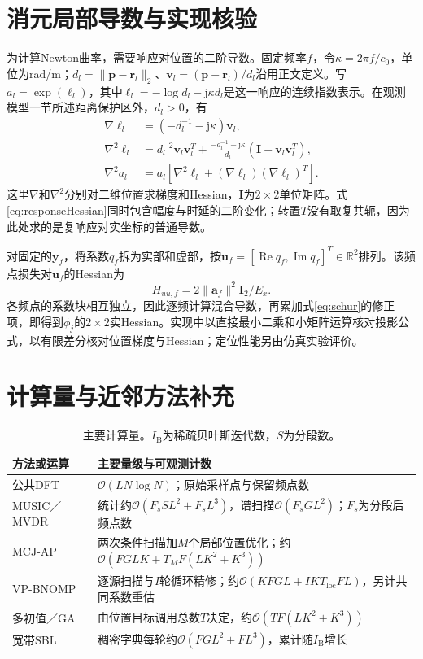 \documentclass[a4paper]{cas-sc}
\numberwithin{equation}{section}
\numberwithin{figure}{section}
\numberwithin{table}{section}
\newcommand{\R}{\mathbb R}
\newcommand{\Rea}{\operatorname{Re}}
\begin{document}
\section{消元局部导数与实现核验}\label{app:derivatives}
为计算Newton曲率，需要响应对位置的二阶导数。固定频率$f$，令$\kappa=2\pi f/c_0$，单位为rad/m；$d_l=\|\bm p-\bm r_l\|_2$、$\bm v_l=(\bm p-\bm r_l)/d_l$沿用正文定义。写$a_l=\exp(\ell_l)$，其中$\ell_l=-\log d_l-\mathrm j\kappa d_l$是这一响应的连续指数表示。在观测模型一节所述距离保护区外，$d_l>0$，有
\begin{align}
 \nabla\ell_l&=(-d_l^{-1}-\mathrm j\kappa)\bm v_l,\\
 \nabla^2\ell_l&=d_l^{-2}\bm v_l\bm v_l^T
 +\frac{-d_l^{-1}-\mathrm j\kappa}{d_l}
 (\bm I-\bm v_l\bm v_l^T),\\
 \nabla^2 a_l&=a_l[\nabla^2\ell_l+(\nabla\ell_l)(\nabla\ell_l)^T].\label{eq:responseHessian}
\end{align}
这里$\nabla$和$\nabla^2$分别对二维位置求梯度和Hessian，$\bm I$为$2\times2$单位矩阵。式\eqref{eq:responseHessian}同时包含幅度与时延的二阶变化；转置$T$没有取复共轭，因为此处求的是复响应对实坐标的普通导数。

对固定的$\bm y_f$，将系数$q_f$拆为实部和虚部，按$\bm u_f=[\Rea q_f,\operatorname{Im}q_f]^T\in\R^2$排列。该频点损失对$\bm u_f$的Hessian为
\begin{equation}
 H_{uu,f}=2\|\bm a_f\|^2\bm I_2/E_x .
\end{equation}
各频点的系数块相互独立，因此逐频计算混合导数，再累加式\eqref{eq:schur}的修正项，即得到$\phi_j$的$2\times2$实Hessian。实现中以直接最小二乘和小矩阵运算核对投影公式，以有限差分核对位置梯度与Hessian；定位性能另由仿真实验评价。


\FloatBarrier

\section{计算量与近邻方法补充}
\begin{table}[pos=H]
\centering\small
\caption{主要计算量。$I_{\mathrm B}$为稀疏贝叶斯迭代数，$S$为分段数。}\label{tab:complexity}
\begin{tabularx}{\linewidth}{@{}lX@{}}\toprule
方法或运算 & 主要量级与可观测计数\\\midrule
公共DFT & $\mathcal O(LN\log N)$；原始采样点与保留频点数\\
MUSIC／MVDR & 统计约$\mathcal O(F_sSL^2+F_sL^3)$，谱扫描$\mathcal O(F_sGL^2)$；$F_s$为分段后频点数\\
MCJ-AP & 两次条件扫描加$M$个局部位置优化；约$\mathcal O(FGLK+T_MF(LK^2+K^3))$\\
VP-BNOMP & 逐源扫描与$I$轮循环精修；约$\mathcal O(KFGL+IKT_{\mathrm{loc}}FL)$，另计共同系数重估\\
多初值／GA & 由位置目标调用总数$T$决定，约$\mathcal O(TF(LK^2+K^3))$\\
宽带SBL & 稠密字典每轮约$\mathcal O(FGL^2+FL^3)$，累计随$I_{\mathrm B}$增长\\\bottomrule
\end{tabularx}
\end{table}
\end{document}
